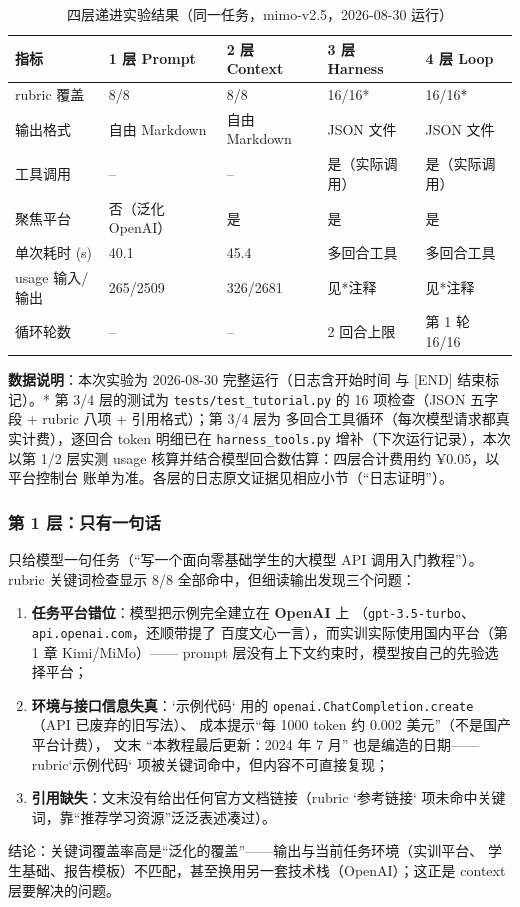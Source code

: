 \begin{table}[H]
\centering
\caption{四层递进实验结果（同一任务，mimo-v2.5，2026-08-30 运行）}
\label{tab:ch2_result}
\small
\setlength{\tabcolsep}{3pt}
\begin{tabular}{p{2.5cm}p{2.3cm}p{2.3cm}p{2.3cm}p{2.3cm}}
\toprule
\textbf{指标} & \textbf{1 层 Prompt} & \textbf{2 层 Context} & \textbf{3 层 Harness} & \textbf{4 层 Loop} \\
\midrule
rubric 覆盖 & 8/8 & 8/8 & 16/16* & 16/16* \\
输出格式 & 自由 Markdown & 自由 Markdown & JSON 文件 & JSON 文件 \\
工具调用 & -- & -- & 是（实际调用） & 是（实际调用） \\
聚焦平台 & 否（泛化 OpenAI） & 是 & 是 & 是 \\
单次耗时 (s) & 40.1 & 45.4 & 多回合工具 & 多回合工具 \\
usage 输入/输出 & 265/2509 & 326/2681 & 见*注释 & 见*注释 \\
循环轮数 & -- & -- & 2 回合上限 & 第 1 轮 16/16 \\
\bottomrule
\end{tabular}
\end{table}

\textbf{数据说明}：本次实验为 2026-08-30 完整运行（日志含开始时间
与 [END] 结束标记）。* 第 3/4 层的测试为 \texttt{tests/test\_tutorial.py}
的 16 项检查（JSON 五字段 + rubric 八项 + 引用格式）；第 3/4 层为
多回合工具循环（每次模型请求都真实计费），逐回合 token 明细已在
\texttt{harness\_tools.py} 增补（下次运行记录），本次以第 1/2 层实测
usage 核算并结合模型回合数估算：四层合计费用约 ¥0.05，以平台控制台
账单为准。各层的日志原文证据见相应小节（``日志证明''）。

\subsubsection{第 1 层：只有一句话}

只给模型一句任务（``写一个面向零基础学生的大模型 API 调用入门教程''）。
rubric 关键词检查显示 8/8 全部命中，但细读输出发现三个问题：
\begin{enumerate}[leftmargin=4em,itemsep=0pt,topsep=2pt]
    \item \textbf{任务平台错位}：模型把示例完全建立在 \textbf{OpenAI} 上
          （\texttt{gpt-3.5-turbo}、\nolinkurl{api.openai.com}，还顺带提了
          百度文心一言），而实训实际使用国内平台（第 1 章 Kimi/MiMo）——
          prompt 层没有上下文约束时，模型按自己的先验选择平台；
    \item \textbf{环境与接口信息失真}：`示例代码` 用的
          \texttt{openai.ChatCompletion.create}（API 已废弃的旧写法）、
          成本提示``每 1000 token 约 0.002 美元''（不是国产平台计费），
          文末 ``本教程最后更新：2024 年 7 月'' 也是编造的日期——
          rubric`示例代码` 项被关键词命中，但内容不可直接复现；
    \item \textbf{引用缺失}：文末没有给出任何官方文档链接（rubric
          `参考链接` 项未命中关键词，靠``推荐学习资源''泛泛表述凑过）。
\end{enumerate}
结论：关键词覆盖率高是``泛化的覆盖''——输出与当前任务环境（实训平台、
学生基础、报告模板）不匹配，甚至换用另一套技术栈（OpenAI）；这正是
context 层要解决的问题。

